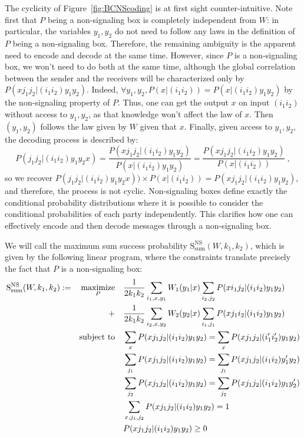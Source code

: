The cyclicity of Figure~\ref{fig:BCNScoding} is at first sight counter-intuitive. Note first that $P$ being a non-signaling box is completely independent from $W$: in particular, the variables $y_1,y_2$ do not need to follow any laws in the definition of $P$ being a non-signaling box. Therefore, the remaining ambiguity is the apparent need to encode and decode at the same time. However, since $P$ is a non-signaling box, we won't need to do both at the same time, although the global correlation between the sender and the receivers will be characterized only by $P(xj_1j_2|(i_1i_2)y_1y_2)$. Indeed, $\forall y_1,y_2, P(x|(i_1i_2)) = P(x|(i_1i_2)y_1y_2)$ by the non-signaling property of $P$. Thus, one can get the output $x$ on input $(i_1i_2)$ without access to $y_1,y_2$, as that knowledge won't affect the law of $x$. Then $(y_1,y_2)$ follows the law given by $W$ given that $x$. Finally, given access to $y_1,y_2$, the decoding process is described by:
          \[ P(j_1j_2|(i_1i_2) y_1 y_2 x) = \frac{P(xj_1j_2|(i_1i_2) y_1 y_2)}{P(x|(i_1i_2) y_1 y_2)} =  \frac{P(xj_1j_2|(i_1i_2) y_1 y_2)}{P(x|(i_1i_2))}  \ , \]
          so we recover $P(j_1j_2|(i_1i_2) y_1 y_2 x)) \times P(x |(i_1 i_2)) = P(xj_1j_2|(i_1i_2)y_1y_2)$, and therefore, the process is not cyclic. Non-signaling boxes define exactly the conditional probability distributions where it is possible to consider the conditional probabilities of each party independently. This clarifies how one can effectively encode and then decode messages through a non-signaling box.

We will call the maximum sum success probability $\mathrm{S}_{\text{sum}}^{\mathrm{NS}}(W,k_1,k_2)$, which is given by the following linear program, where the constraints translate precisely the fact that $P$ is a non-signaling box:
\begin{equation}
  \begin{aligned}
    \mathrm{S}_{\text{sum}}^{\mathrm{NS}}(W,k_1,k_2) := &&\underset{P}{\operatorname{\text{maximize}}} &&& \frac{1}{2k_1k_2}\sum_{i_1,x,y_1} W_1(y_1|x)\sum_{i_2,j_2} P(xi_1j_2|(i_1i_2)y_1y_2)\\
    &&+&&& \frac{1}{2k_1k_2}\sum_{i_2,x,y_2} W_2(y_2|x) \sum_{i_1,j_1} P(xj_1i_2|(i_1i_2)y_1y_2)\\
    &&\operatorname{\text{subject to}} &&& \sum_{x} P(xj_1j_2|(i_1i_2)y_1y_2) = \sum_{x} P(xj_1j_2|(i_1'i_2')y_1y_2)\\
    &&&&& \sum_{j_1} P(xj_1j_2|(i_1i_2)y_1y_2) = \sum_{j_1} P(xj_1j_2|(i_1i_2)y_1'y_2)\\
    &&&&& \sum_{j_2} P(xj_1j_2|(i_1i_2)y_1y_2) = \sum_{j_2} P(xj_1j_2|(i_1i_2)y_1y_2')\\
    &&&&& \sum_{x,j_1,j_2} P(xj_1j_2|(i_1i_2)y_1y_2) = 1\\
    &&&&& P(xj_1j_2|(i_1i_2)y_1y_2) \geq 0
  \end{aligned}
\end{equation}

